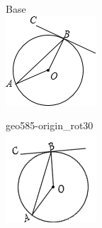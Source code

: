\documentclass[12pt]{article}
\begin{document}
\begin{center}
\begin{minipage}{0.32\textwidth}\centering
Base\\
\includegraphics[width=0.95\linewidth]{out_rommath_origin/items/geo585-origin/assets/figure.png}
\end{minipage}
\hfill\begin{minipage}{0.32\textwidth}\centering
geo585-origin\_rot30\\
\includegraphics[width=0.95\linewidth]{out_rommath_origin/items/geo585-origin/assets/figure_rot30.png}

\end{minipage}
\end{center}
\end{document}
